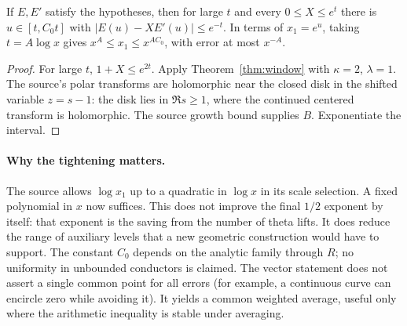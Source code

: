 \documentclass[11pt,letterpaper]{article}
\theoremstyle{definition}\newtheorem{definition}[theorem]{Definition}
\theoremstyle{remark}\newtheorem{remark}[theorem]{Remark}
\begin{document}
\begin{corollary}\label{cor:window}
If $E,E'$ satisfy the hypotheses, then for large $t$ and every $0\le X\le e^t$ there is $u\in[t,C_0t]$ with $|E(u)-XE'(u)|\le e^{-t}$. In terms of $x_1=e^u$, taking $t=A\log x$ gives $x^A\le x_1\le x^{AC_0}$, with error at most $x^{-A}$.
\end{corollary}
\begin{proof}
For large $t$, $1+X\le e^{2t}$. Apply Theorem~\ref{thm:window} with $\kappa=2$, $\lambda=1$. The source's polar transforms are holomorphic near the closed disk in the shifted variable $z=s-1$: the disk lies in $\Re s\ge1$, where the continued centered transform is holomorphic. The source growth bound supplies $B$. Exponentiate the interval.
\end{proof}
\paragraph{Why the tightening matters.} The source allows $\log x_1$ up to a quadratic in $\log x$ in its scale selection. A fixed polynomial in $x$ now suffices. This does not improve the final $1/2$ exponent by itself: that exponent is the saving from the number of theta lifts. It does reduce the range of auxiliary levels that a new geometric construction would have to support. The constant $C_0$ depends on the analytic family through $R$; no uniformity in unbounded conductors is claimed. The vector statement does not assert a single common point for all errors (for example, a continuous curve can encircle zero while avoiding it). It yields a common weighted average, useful only where the arithmetic inequality is stable under averaging.
\end{document}
